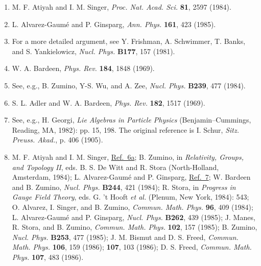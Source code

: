 \begin{enumerate}
\item[6a.] \label{ch22-ref-6a}
M. F. Atiyah and I. M. Singer, \emph{Proc. Nat. Acad. Sci.} \textbf{81},
2597 (1984).

\item {}\label{ch22-ref-7}
L. Alvarez-Gaum\'e and P. Ginsparg, \emph{Ann. Phys.} \textbf{161}, 423
(1985).

\item[7a.] \label{ch22-ref-7a}
For a more detailed argument, see Y. Frishman, A. Schwimmer, T. Banks,
and S. Yankielowicz, \emph{Nucl. Phys.} \textbf{B177}, 157 (1981).

\item {}\label{ch22-ref-8}
W. A. Bardeen, \emph{Phys. Rev.} \textbf{184}, 1848 (1969).

\item[8a.] \label{ch22-ref-8a}
See, e.g., B. Zumino, Y-S. Wu, and A. Zee, \emph{Nucl. Phys.}
\textbf{B239}, 477 (1984).

\item {}\label{ch22-ref-9}
S. L. Adler and W. A. Bardeen, \emph{Phys. Rev.} \textbf{182}, 1517
(1969).

\item {}\label{ch22-ref-10}
See, e.g., H. Georgi, \emph{Lie Algebras in Particle Physics}
(Benjamin--Cummings, Reading, MA, 1982): pp. 15, 198. The original
reference is I. Schur, \emph{Sitz. Preuss. Akad.}, p. 406 (1905).

\item[10a.] \label{ch22-ref-10a}
M. F. Atiyah and I. M. Singer, \hyperref[ch22-ref-6a]{Ref.~6a};
B. Zumino, in \emph{Relativity, Groups, and Topology II}, eds.
B. S. De Witt and R. Stora (North-Holland, Amsterdam, 1984);
L. Alvarez-Gaum\'e and P. Ginsparg, \hyperref[ch22-ref-7]{Ref.~7};
W. Bardeen and B. Zumino, \emph{Nucl. Phys.} \textbf{B244}, 421 (1984);
R. Stora, in \emph{Progress in Gauge Field Theory}, eds. G. 't Hooft
\emph{et al.} (Plenum, New York, 1984): 543; O. Alvarez, I. Singer, and
B. Zumino, \emph{Commun. Math. Phys.} \textbf{96}, 409 (1984);
L. Alvarez-Gaum\'e and P. Ginsparg, \emph{Nucl. Phys.} \textbf{B262},
439 (1985); J. Manes, R. Stora, and B. Zumino,
\emph{Commun. Math. Phys.} \textbf{102}, 157 (1985); B. Zumino,
\emph{Nucl. Phys.} \textbf{B253}, 477 (1985); J. M. Bismut and
D. S. Freed, \emph{Commun. Math. Phys.} \textbf{106}, 159 (1986);
\textbf{107}, 103 (1986); D. S. Freed, \emph{Commun. Math. Phys.}
\textbf{107}, 483 (1986).


\end{enumerate}
